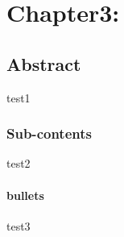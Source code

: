\section{Chapter3:}

\subsection{Abstract}
test1
\subsubsection{Sub-contents}
test2
\paragraph{bullets}
test3

\newpage